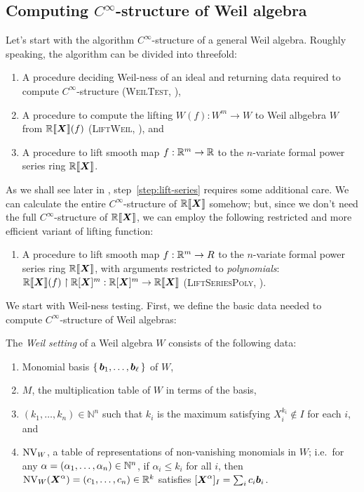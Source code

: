 \documentclass[%
  sigconf,authorversion,screen]{acmart}
\begin{document}
\subsection{Computing $C^\infty$-structure of Weil algebra}
\label{sec:general-weil-algs}
Let's start with the algorithm $C^\infty$-structure of a general Weil algebra.
Roughly speaking, the algorithm can be divided into threefold:

\begin{enumerate}
  \item A procedure deciding Weil-ness of an ideal and returning data required to compute $C^\infty$-structure (\textsc{WeilTest}, ),
  \item A procedure to compute the lifting  $W(f): W^m \to W$ to Weil albgebra $W$ from $\mathord{\mathbb{R}\llbracket\boldsymbol{X}\rrbracket}(f)$ (\textsc{LiftWeil}, ), and
  \item A procedure to lift smooth map $f: \mathbb{R}^m \to \mathbb{R}$ to the $n$-variate formal power series ring $\mathord{\mathbb{R}\llbracket\boldsymbol{X}\rrbracket}$.\label{step:lift-series}
\end{enumerate}

As we shall see later in , step~\ref{step:lift-series} requires some additional care.
We can calculate the entire $C^\infty$-structure of $\mathord{\mathbb{R}\llbracket\boldsymbol{X}\rrbracket}$ somehow; but, since we don't need the full $C^\infty$-structure of $\mathord{\mathbb{R}\llbracket\boldsymbol{X}\rrbracket}$, we can employ the following restricted and more efficient variant of lifting function:

\begin{enumerate}[label=$(3)'$]
  \item A procedure to lift smooth map $f: \mathbb{R}^m \to R$ to the $n$-variate formal power series ring $\mathord{\mathbb{R}\llbracket\boldsymbol{X}\rrbracket}$, with arguments restricted to \emph{polynomials}: $\mathord{\mathbb{R}\llbracket\boldsymbol{X}\rrbracket}(f) \upharpoonright \mathbb{R}[\boldsymbol{X}]^m : \mathbb{R}[\boldsymbol{X}]^m \to \mathord{\mathbb{R}\llbracket\boldsymbol{X}\rrbracket}$
  (\textsc{LiftSeriesPoly}, ).
\end{enumerate}

We start with Weil-ness testing.
First, we define the basic data needed to compute $C^\infty$-structure of Weil algebras:

\begin{definition}
  The \emph{Weil setting} of a Weil algebra $W$ consists of the following data:
  \begin{enumerate}[ref=(\arabic*)]
    \item Monomial basis $\set{\boldsymbol{b}_1, \dots, \boldsymbol{b}_\ell}$ of $W$,
    \item $M$, the multiplication table of $W$ in terms of the basis,
    \item $(k_1, \dots, k_n) \in \mathbb{N}^n$ such that $k_i$ is the maximum satisfying $X_i^{k_i} \notin I$ for each $i$, and
    \item $\operatorname{NV}_W$, a table of representations of non-vanishing monomials in $W$;
    i.e.\ for any $\alpha = (\alpha_1, \dots, \alpha_n) \in \mathbb{N}^n$, if $\alpha_i \leq k_i$ for all $i$, then $\operatorname{NV}_W(\boldsymbol{X}^\alpha) = (c_1, \dots, c_n) \in \mathbb{R}^k$ satisfies $[\boldsymbol{X}^\alpha]_I = \sum_i c_i \boldsymbol{b}_i$.\label{item:nonvan}
  \end{enumerate}
\end{definition}
\end{document}
